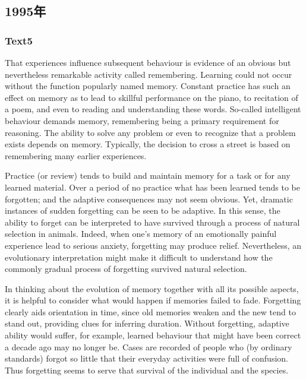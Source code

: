\documentclass[a4paper]{article}
\begin{document}
\subsection{1995年}
\subsubsection{Text5}

\par
That experiences influence subsequent behaviour is evidence of an obvious but nevertheless remarkable activity called remembering. Learning could not occur without the function popularly named memory. Constant practice has such an effect on memory as to lead to skillful performance on the piano, to recitation of a poem, and even to reading and understanding these words. So-called intelligent behaviour demands memory, remembering being a primary requirement for reasoning. The ability to solve any problem or even to recognize that a problem exists depends on memory. Typically, the decision to cross a street is based on remembering many earlier experiences.

\par
Practice (or review) tends to build and maintain memory for a task or for any learned material. Over a period of no practice what has been learned tends to be forgotten; and the adaptive consequences may not seem obvious. Yet, dramatic instances of sudden forgetting can be seen to be adaptive. In this sense, the ability to forget can be interpreted to have survived through a process of natural selection in animals. Indeed, when one’s memory of an emotionally painful experience lead to serious anxiety, forgetting may produce relief. Nevertheless, an evolutionary interpretation might make it difficult to understand how the commonly gradual process of forgetting survived natural selection.

\par
In thinking about the evolution of memory together with all its possible aspects, it is helpful to consider what would happen if memories failed to fade. Forgetting clearly aids orientation in time, since old memories weaken and the new tend to stand out, providing clues for inferring duration. Without forgetting, adaptive ability would suffer, for example, learned behaviour that might have been correct a decade ago may no longer be. Cases are recorded of people who (by ordinary standards) forgot so little that their everyday activities were full of confusion. Thus forgetting seems to serve that survival of the individual and the species.
\end{document}
